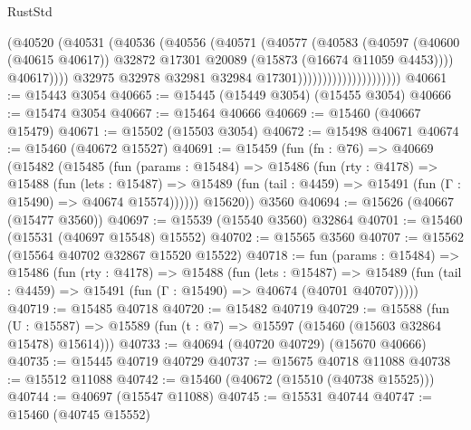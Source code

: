 \begin{lexlean}{RustStd}
\begin{coremodule}
                                          (@40520
                                            (@40531
                                              (@40536
                                                (@40556
                                                  (@40571
                                                    (@40577
                                                      (@40583
                                                        (@40597
                                                          (@40600 (@40615 @40617))
                                                          @32872
                                                          @17301
                                                          @20089
                                                          (@15873 (@16674 @11059 @4453))))
                                                      @40617))))
                                              @32975
                                              @32978
                                              @32981
                                              @32984
                                              @17301)))))))))))))))))))))
@40661 := @15443 @3054
@40665 := @15445 (@15449 @3054) (@15455 @3054)
@40666 := @15474 @3054
@40667 := @15464 @40666
@40669 := @15460 (@40667 @15479)
@40671 := @15502 (@15503 @3054)
@40672 := @15498 @40671
@40674 := @15460 (@40672 @15527)
@40691 := @15459
    (fun (fn : @76) =>
    @40669
      (@15482
        (@15485
          (fun (params : @15484) =>
          @15486
            (fun (rty : @4178) =>
            @15488
              (fun (lets : @15487) =>
              @15489 (fun (tail : @4459) => @15491 (fun (Γ : @15490) => @40674 @15574))))))
        @15620))
    @3560
@40694 := @15626 (@40667 (@15477 @3560))
@40697 := @15539 (@15540 @3560) @32864
@40701 := @15460 (@15531 (@40697 @15548) @15552)
@40702 := @15565 @3560
@40707 := @15562 (@15564 @40702 @32867 @15520 @15522)
@40718 := fun (params : @15484) =>
  @15486
    (fun (rty : @4178) =>
    @15488
      (fun (lets : @15487) =>
      @15489 (fun (tail : @4459) => @15491 (fun (Γ : @15490) => @40674 (@40701 @40707)))))
@40719 := @15485 @40718
@40720 := @15482 @40719
@40729 := @15588
    (fun (U : @15587) => @15589 (fun (t : @7) => @15597 (@15460 (@15603 @32864 @15478) @15614)))
@40733 := @40694 (@40720 @40729) (@15670 @40666)
@40735 := @15445 @40719 @40729
@40737 := @15675 @40718 @11088
@40738 := @15512 @11088
@40742 := @15460 (@40672 (@15510 (@40738 @15525)))
@40744 := @40697 (@15547 @11088)
@40745 := @15531 @40744
@40747 := @15460 (@40745 @15552)

\end{coremodule}
\end{lexlean}
